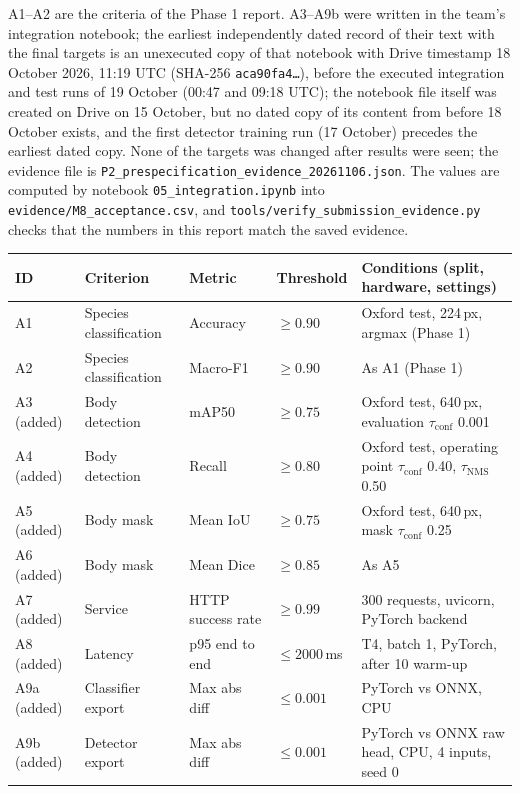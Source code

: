 \documentclass[11pt,a4paper]{article}
\newcommand{\tconf}{$\tau_{\text{conf}}$}
\newcommand{\tnms}{$\tau_{\text{NMS}}$}
\begin{document}
A1--A2 are the criteria of the Phase 1 report. A3--A9b were written in the team's integration notebook; the earliest independently dated record of their text with the final targets is an unexecuted copy of that notebook with Drive timestamp 18 October 2026, 11:19 UTC (SHA-256 \texttt{aca90fa4\ldots}), before the executed integration and test runs of 19 October (00:47 and 09:18 UTC); the notebook file itself was created on Drive on 15 October, but no dated copy of its content from before 18 October exists, and the first detector training run (17 October) precedes the earliest dated copy. None of the targets was changed after results were seen; the evidence file is \texttt{P2\_prespecification\_}\allowbreak\texttt{evidence\_20261106.json}. The values are computed by notebook \texttt{05\_integration.ipynb} into \texttt{evidence/M8\_acceptance.csv}, and \texttt{tools/verify\_submission\_evidence.py} checks that the numbers in this report match the saved evidence.

{\small
\begin{tabularx}{\linewidth}{@{}l Y l l Y@{}}
\toprule
ID & Criterion & Metric & Threshold & Conditions (split, hardware, settings) \\
\midrule
A1 & Species classification & Accuracy & $\geq 0.90$ & Oxford test, 224\,px, argmax (Phase 1) \\
A2 & Species classification & Macro-F1 & $\geq 0.90$ & As A1 (Phase 1) \\
A3 (added) & Body detection & mAP50 & $\geq 0.75$ & Oxford test, 640\,px, evaluation \tconf{} 0.001 \\
A4 (added) & Body detection & Recall & $\geq 0.80$ & Oxford test, operating point \tconf{} 0.40, \tnms{} 0.50 \\
A5 (added) & Body mask & Mean IoU & $\geq 0.75$ & Oxford test, 640\,px, mask \tconf{} 0.25 \\
A6 (added) & Body mask & Mean Dice & $\geq 0.85$ & As A5 \\
A7 (added) & Service & HTTP success rate & $\geq 0.99$ & 300 requests, uvicorn, PyTorch backend \\
A8 (added) & Latency & p95 end to end & $\leq 2000$\,ms & T4, batch 1, PyTorch, after 10 warm-up \\
A9a (added) & Classifier export & Max abs diff & $\leq 0.001$ & PyTorch vs ONNX, CPU \\
A9b (added) & Detector export & Max abs diff & $\leq 0.001$ & PyTorch vs ONNX raw head, CPU, 4 inputs, seed 0 \\
\bottomrule
\end{tabularx}}
\end{document}
